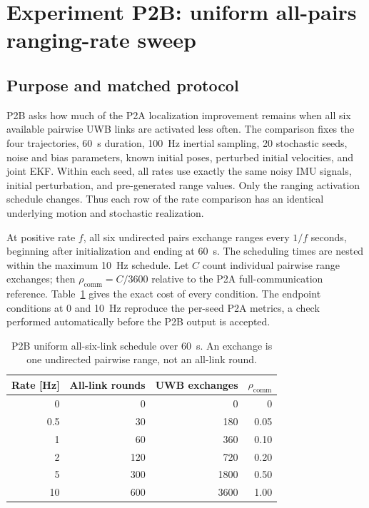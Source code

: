 \section{Experiment P2B: uniform all-pairs ranging-rate sweep}
\subsection{Purpose and matched protocol}
P2B asks how much of the P2A localization improvement remains when all six available pairwise UWB links are activated less often. The comparison fixes the four trajectories, \SI{60}{s} duration, \SI{100}{Hz} inertial sampling, 20 stochastic seeds, noise and bias parameters, known initial poses, perturbed initial velocities, and joint EKF. Within each seed, all rates use exactly the same noisy IMU signals, initial perturbation, and pre-generated range values. Only the ranging activation schedule changes. Thus each row of the rate comparison has an identical underlying motion and stochastic realization.

At positive rate \(f\), all six undirected pairs exchange ranges every \(1/f\) seconds, beginning after initialization and ending at \SI{60}{s}. The scheduling times are nested within the maximum \SI{10}{Hz} schedule. Let \(C\) count individual pairwise range exchanges; then \(\rho_{\mathrm{comm}}=C/3600\) relative to the P2A full-communication reference. Table~\ref{tab:p2b_schedule} gives the exact cost of every condition. The endpoint conditions at 0 and \SI{10}{Hz} reproduce the per-seed P2A metrics, a check performed automatically before the P2B output is accepted.

\begin{table}[htbp]
    \centering
    \caption{P2B uniform all-six-link schedule over \SI{60}{s}. An exchange is one undirected pairwise range, not an all-link round.}
    \label{tab:p2b_schedule}
    \begin{tabular}{rrrr}
        \toprule
        Rate [Hz] & All-link rounds & UWB exchanges & \(\rho_{\mathrm{comm}}\) \\
        \midrule
        0 & 0 & 0 & 0 \\
        0.5 & 30 & 180 & 0.05 \\
        1 & 60 & 360 & 0.10 \\
        2 & 120 & 720 & 0.20 \\
        5 & 300 & 1800 & 0.50 \\
        10 & 600 & 3600 & 1.00 \\
        \bottomrule
    \end{tabular}
\end{table}

